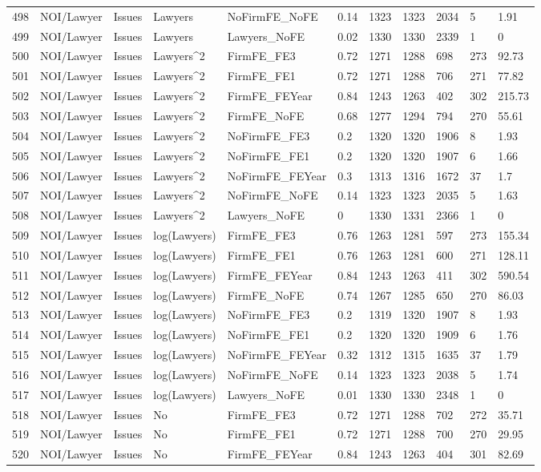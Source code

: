 \documentclass{article}
\begin{document}
\begin{table}[H]
\begin{tabular}{rllllllllll}
  498 & NOI/Lawyer & Issues & Lawyers & NoFirmFE\_NoFE & 0.14 & 1323 & 1323 & 2034 & 5 & 1.91 \\ 
  499 & NOI/Lawyer & Issues & Lawyers & Lawyers\_NoFE & 0.02 & 1330 & 1330 & 2339 & 1 & 0 \\ 
  500 & NOI/Lawyer & Issues & Lawyers^2 & FirmFE\_FE3 & 0.72 & 1271 & 1288 & 698 & 273 & 92.73 \\ 
  501 & NOI/Lawyer & Issues & Lawyers^2 & FirmFE\_FE1 & 0.72 & 1271 & 1288 & 706 & 271 & 77.82 \\ 
  502 & NOI/Lawyer & Issues & Lawyers^2 & FirmFE\_FEYear & 0.84 & 1243 & 1263 & 402 & 302 & 215.73 \\ 
  503 & NOI/Lawyer & Issues & Lawyers^2 & FirmFE\_NoFE & 0.68 & 1277 & 1294 & 794 & 270 & 55.61 \\ 
  504 & NOI/Lawyer & Issues & Lawyers^2 & NoFirmFE\_FE3 & 0.2 & 1320 & 1320 & 1906 & 8 & 1.93 \\ 
  505 & NOI/Lawyer & Issues & Lawyers^2 & NoFirmFE\_FE1 & 0.2 & 1320 & 1320 & 1907 & 6 & 1.66 \\ 
  506 & NOI/Lawyer & Issues & Lawyers^2 & NoFirmFE\_FEYear & 0.3 & 1313 & 1316 & 1672 & 37 & 1.7 \\ 
  507 & NOI/Lawyer & Issues & Lawyers^2 & NoFirmFE\_NoFE & 0.14 & 1323 & 1323 & 2035 & 5 & 1.63 \\ 
  508 & NOI/Lawyer & Issues & Lawyers^2 & Lawyers\_NoFE & 0 & 1330 & 1331 & 2366 & 1 & 0 \\ 
  509 & NOI/Lawyer & Issues & log(Lawyers) & FirmFE\_FE3 & 0.76 & 1263 & 1281 & 597 & 273 & 155.34 \\ 
  510 & NOI/Lawyer & Issues & log(Lawyers) & FirmFE\_FE1 & 0.76 & 1263 & 1281 & 600 & 271 & 128.11 \\ 
  511 & NOI/Lawyer & Issues & log(Lawyers) & FirmFE\_FEYear & 0.84 & 1243 & 1263 & 411 & 302 & 590.54 \\ 
  512 & NOI/Lawyer & Issues & log(Lawyers) & FirmFE\_NoFE & 0.74 & 1267 & 1285 & 650 & 270 & 86.03 \\ 
  513 & NOI/Lawyer & Issues & log(Lawyers) & NoFirmFE\_FE3 & 0.2 & 1319 & 1320 & 1907 & 8 & 1.93 \\ 
  514 & NOI/Lawyer & Issues & log(Lawyers) & NoFirmFE\_FE1 & 0.2 & 1320 & 1320 & 1909 & 6 & 1.76 \\ 
  515 & NOI/Lawyer & Issues & log(Lawyers) & NoFirmFE\_FEYear & 0.32 & 1312 & 1315 & 1635 & 37 & 1.79 \\ 
  516 & NOI/Lawyer & Issues & log(Lawyers) & NoFirmFE\_NoFE & 0.14 & 1323 & 1323 & 2038 & 5 & 1.74 \\ 
  517 & NOI/Lawyer & Issues & log(Lawyers) & Lawyers\_NoFE & 0.01 & 1330 & 1330 & 2348 & 1 & 0 \\ 
  518 & NOI/Lawyer & Issues & No & FirmFE\_FE3 & 0.72 & 1271 & 1288 & 702 & 272 & 35.71 \\ 
  519 & NOI/Lawyer & Issues & No & FirmFE\_FE1 & 0.72 & 1271 & 1288 & 700 & 270 & 29.95 \\ 
  520 & NOI/Lawyer & Issues & No & FirmFE\_FEYear & 0.84 & 1243 & 1263 & 404 & 301 & 82.69 \\ 
   \hline
\end{tabular}
\end{table}
\end{document}
